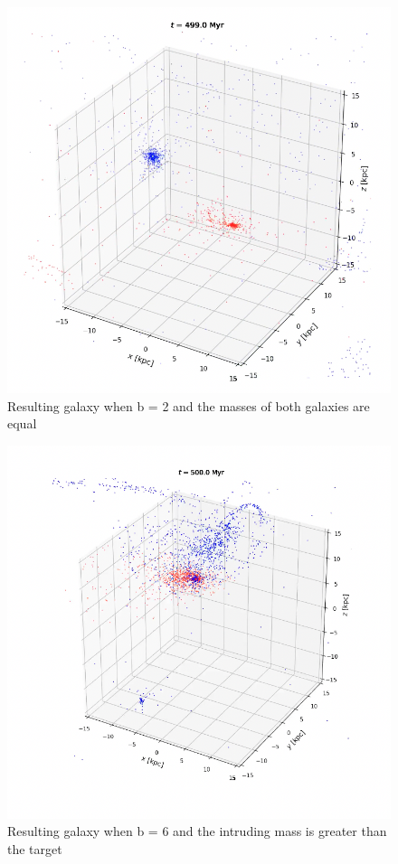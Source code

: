 \documentclass[linenumbers,RNAAS,trackchanges]{aastex631}
\begin{document}
\begin{figure}[H]
    \centering
    \includegraphics[scale=.50]{vip/b6equalmass.png}
    \caption{Resulting galaxy when b = 2 and the masses of both galaxies are equal}
    \label{fig:code}
\end{figure}
\begin{figure}[H]
    \centering
    \includegraphics[scale=.50]{vip/b6intrudermass.png}
    \caption{Resulting galaxy when b = 6 and the intruding mass is greater than the target}
    \label{fig:code}
\end{figure}
\end{document}
